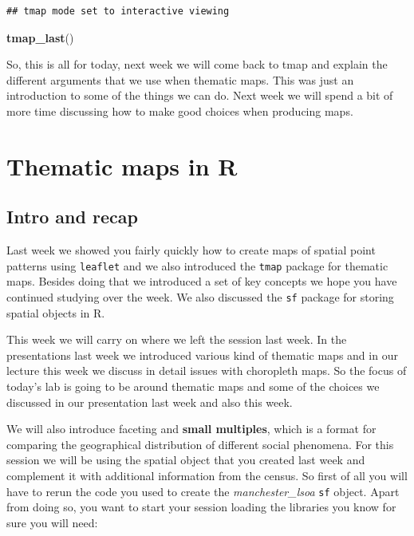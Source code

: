 \documentclass[]{book}
\newenvironment{Shaded}{\begin{snugshade}}{\end{snugshade}}
\newcommand{\KeywordTok}[1]{\textcolor[rgb]{0.13,0.29,0.53}{\textbf{#1}}}
\newcommand{\NormalTok}[1]{#1}
\begin{document}
\begin{verbatim}
## tmap mode set to interactive viewing
\end{verbatim}

\begin{Shaded}
\begin{Highlighting}[]
\KeywordTok{tmap_last}\NormalTok{()}
\end{Highlighting}
\end{Shaded}

\hypertarget{htmlwidget-41b078f795b522dd390d}{}

So, this is all for today, next week we will come back to tmap and explain the different arguments that we use when thematic maps. This was just an introduction to some of the things we can do. Next week we will spend a bit of more time discussing how to make good choices when producing maps.

\hypertarget{thematic-maps-in-r}{%
\chapter{Thematic maps in R}\label{thematic-maps-in-r}}

\hypertarget{intro-and-recap}{%
\section{Intro and recap}\label{intro-and-recap}}

Last week we showed you fairly quickly how to create maps of spatial point patterns using \texttt{leaflet} and we also introduced the \texttt{tmap} package for thematic maps. Besides doing that we introduced a set of key concepts we hope you have continued studying over the week. We also discussed the \texttt{sf} package for storing spatial objects in R.

This week we will carry on where we left the session last week. In the presentations last week we introduced various kind of thematic maps and in our lecture this week we discuss in detail issues with choropleth maps. So the focus of today's lab is going to be around thematic maps and some of the choices we discussed in our presentation last week and also this week.

We will also introduce faceting and \textbf{small multiples}, which is a format for comparing the geographical distribution of different social phenomena. For this session we will be using the spatial object that you created last week and complement it with additional information from the census. So first of all you will have to rerun the code you used to create the \emph{manchester\_lsoa} \texttt{sf} object. Apart from doing so, you want to start your session loading the libraries you know for sure you will need:
\end{document}
